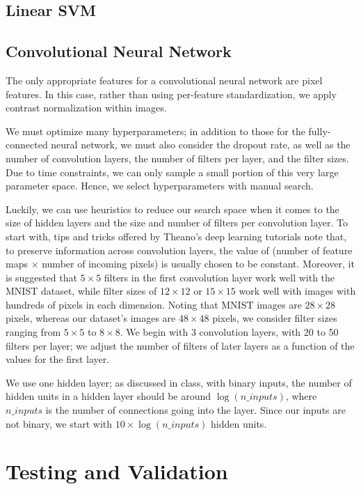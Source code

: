 \documentclass{acm_proc_article-sp}
\begin{document}
\subsection{Linear SVM}


\subsection{Convolutional Neural Network}
The only appropriate features for a convolutional neural network are pixel features. In this case, rather than using per-feature standardization, we apply contrast normalization within images.

We must optimize many hyperparameters; in addition to those for the fully-connected neural network, we must also consider the dropout rate, as well as the number of convolution layers, the number of filters per layer, and the filter sizes. Due to time constraints, we can only sample a small portion of this very large parameter space. Hence, we select hyperparameters with manual search.

Luckily, we can use heuristics to reduce our search space when it comes to the size of hidden layers and the size and number of filters per convolution layer. To start with, tips and tricks offered by Theano's deep learning tutorials note that, to preserve information across convolution layers, the value of (number of feature maps $\times$ number of incoming pixels) is usually chosen to be constant. Moreover, it is suggested that $5 \times 5$ filters in the first convolution layer work well with the MNIST dataset, while filter sizes of $12\times12$ or $15\times15$ work well with images with hundreds of pixels in each dimension.\cite{Theano-tut} Noting that MNIST images are $28\times28$ pixels, whereas our dataset's images are $48\times48$ pixels, we consider filter sizes ranging from $5\times 5$ to $8\times 8$. We begin with 3 convolution layers, with 20 to 50 filters per layer; we adjust the number of filters of later layers as a function of the values for the first layer.

We use one hidden layer; as discussed in class, with binary inputs, the number of hidden units in a hidden layer should be around $\log(n\_inputs)$, where $n\_inputs$ is the number of connections going into the layer. Since our inputs are not binary, we start with $10\times \log(n\_inputs)$ hidden units.

\section{Testing and Validation}%
\end{document}
